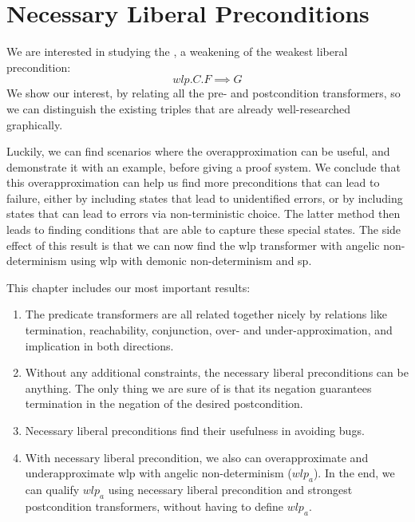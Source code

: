 \chapter{Necessary Liberal Preconditions}\label{ch:nlp} %





We are interested in studying the , a weakening of the weakest liberal precondition: 
$$wlp.C.F\implies G$$
We show our interest, by relating all the pre- and postcondition transformers, so we can distinguish the existing triples that are already well-researched graphically. 

Luckily, we can find scenarios where the overapproximation can be useful, and demonstrate it with an example, before giving a proof system. 
We conclude that this overapproximation can help us find more preconditions that can lead to failure, either by including states that lead to unidentified errors, or by including states that can lead to errors via non-terministic choice. 
The latter method then leads to finding conditions that are able to capture these special states. 
The side effect of this result is that we can now find the wlp transformer with angelic non-determinism using wlp with demonic non-determinism and sp.

This chapter includes our most important results: 
\begin{enumerate}
	\item The predicate transformers are all related together nicely by relations like termination, reachability, conjunction, over- and under-approximation, and implication in both directions. 
	\item Without any additional constraints, the necessary liberal preconditions can be anything. The only thing we are sure of is that its negation guarantees termination in the negation of the desired postcondition. 
	\item Necessary liberal preconditions find their usefulness in avoiding bugs. 
	\item With necessary liberal precondition, we also can overapproximate and underapproximate wlp with angelic non-determinism ($wlp_a$). In the end, we can qualify $wlp_a$ using necessary liberal precondition and strongest postcondition transformers, without having to define $wlp_a$.  
\end{enumerate}


